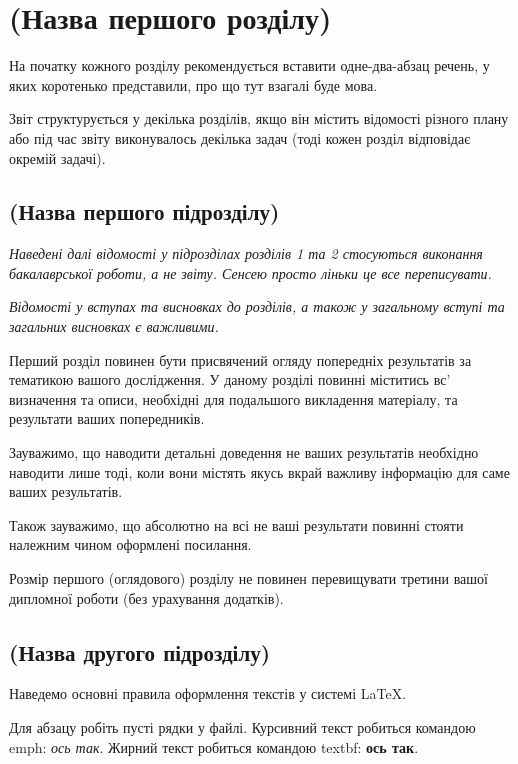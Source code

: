 
\chapter{(Назва першого розділу)}
\label{chap:review}  %

На початку кожного розділу рекомендується вставити одне-два-абзац речень, 
у яких коротенько представили, про що тут взагалі буде мова.

Звіт структурується у декілька розділів, якщо він містить відомості 
різного плану або під час звіту виконувалось декілька задач (тоді кожен 
розділ відповідає окремій задачі).

\section{(Назва першого підрозділу)}

\emph{Наведені далі відомості у підрозділах розділів 1 та 2 стосуються 
виконання бакалаврської роботи, а не звіту. Сенсею просто ліньки це все 
переписувати.}

\emph{Відомості у вступах та висновках до розділів, а також у загальному вступі 
та загальних висновках є важливими.}

Перший розділ повинен бути присвячений огляду попередніх результатів за 
тематикою вашого дослідження. У даному розділі повинні міститись вс' 
визначення та описи, необхідні для подальшого викладення матеріалу, та результати 
ваших попередників.

Зауважимо, що наводити детальні доведення не ваших результатів необхідно 
наводити лише тоді, коли вони містять якусь вкрай важливу інформацію для 
саме ваших результатів.

Також зауважимо, що абсолютно на всі не ваші результати повинні стояти 
належним чином оформлені посилання.

Розмір першого (оглядового) розділу не повинен перевищувати третини вашої 
дипломної роботи (без урахування додатків).


\section{(Назва другого підрозділу)}

Наведемо основні правила оформлення текстів у системі \LaTeX.

Для абзацу робіть пусті рядки у файлі. Курсивний текст робиться командою 
emph: \emph{ось так}. Жирний текст робиться командою textbf: \textbf{ось так}.

